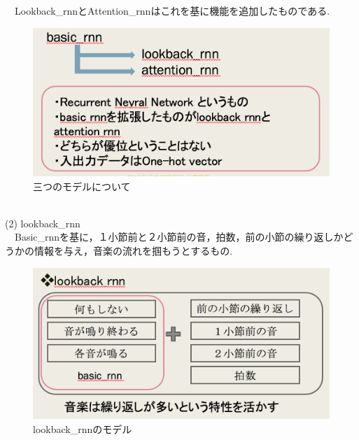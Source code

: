 　Lookback\_rnnとAttention\_rnnはこれを基に機能を追加したものである.
\begin{figure}[!ht]
    \begin{screen}
    \begin{center}
        \includegraphics[scale=0.8,clip]{./img/basic1.png}
        \caption{三つのモデルについて}
        \label{fig:Melody_RNNについて}
    \end{center}
    \end{screen}
\end{figure}\\
\newpage
(2) lookback\_rnn\\
　Basic\_rnnを基に，１小節前と２小節前の音，拍数，前の小節の繰り返しかどうかの情報を与え，音楽の流れを掴もうとするもの.
\begin{figure}[!ht]
    \begin{screen}
    \begin{center}
        \includegraphics[scale=0.8,clip]{./img/lookback1.png}
        \caption{lookback\_rnnのモデル}
        \label{fig:lookback_rnnのモデル}
    \end{center}
    \end{screen}
\end{figure}\\
